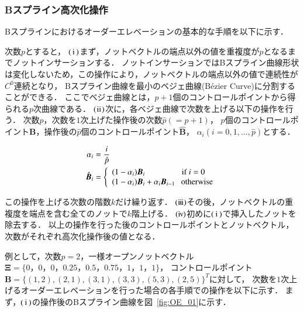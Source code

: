 \subsubsection{Bスプライン高次化操作}
Bスプラインにおけるオーダーエレベーションの基本的な手順を以下に示す．

次数$p$とすると，
$\rm(\hspace{.18em}i\hspace{.18em})$まず，ノットベクトルの端点以外の値を重複度が$p$となるまでノットインサーションする．
ノットインサーションではBスプライン曲線形状は変化しないため，この操作により，ノットベクトルの端点以外の値で連続性が$C^0$連続となり，
Bスプライン曲線を最小のベジェ曲線(Bézier Curve)に分割することができる．
ここでベジェ曲線とは，$p+1$個のコントロールポイントから得られる$p$次曲線である．
$\rm(\hspace{.08em}ii\hspace{.08em})$次に，各ベジェ曲線で次数を上げる以下の操作を行う．
次数$p$，次数を$1$次上げた操作後の次数$\hat{p} (=p+1)$，
$p$個のコントロールポイント$\boldsymbol{B}$，操作後の$\hat{p}$個のコントロールポイント$\hat{\boldsymbol{B}}$，
$\alpha_i(i=0,1,\dots,\hat{p})$とする．

\begin{align}
  \alpha_i &= \frac{i}{\hat{p}} \\
  \hat{\boldsymbol{B}}_i &= \left \{
    \begin{array}{l}
      (1 - \alpha_i)\boldsymbol{B}_i \ \qquad \ \qquad $if$\ i = 0\\
      (1 - \alpha_i)\boldsymbol{B}_i + \alpha_i \boldsymbol{B}_{i-1} \ \ \   $otherwise$
    \end{array}
    \right.
\end{align}

\noindent
この操作を上げる次数の階数$k$だけ繰り返す．
$\rm(i\hspace{-.08em}i\hspace{-.08em}i)$その後，ノットベクトルの重複度を端点を含む全てのノットで$k$階上げる．
$\rm(i\hspace{-.08em}v\hspace{-.06em})$初めに$\rm(\hspace{.18em}i\hspace{.18em})$で挿入したノットを除去する．
以上の操作を行った後のコントロールポイントとノットベクトル，次数がそれぞれ高次化操作後の値となる．

\newpage

例として，次数$p = 2$，一様オープンノットベクトル$\boldsymbol{\Xi}=\{0，0，0，0.25，0.5，0.75，1，1，1\}$，
コントロールポイント$\boldsymbol{B} = \{(1,2),(2,1),(3,1),(3,3),(5,3),(2,5)\}^T$に対して，
次数を$1$次上げるオーダーエレベーションを行った場合の各手順での操作を以下に示す．
まず，$\rm(\hspace{.18em}i\hspace{.18em})$の操作後のBスプライン曲線を図~\ref{fig:OE_01}に示す．

